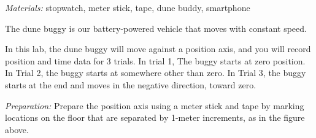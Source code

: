 \documentclass[answers]{exam}
\begin{document}
\noindent \textit{Materials:} stopwatch, meter stick, tape, dune buddy, smartphone 

\medskip

\noindent The dune buggy is our battery-powered vehicle that moves with constant speed. 

\begin{center}
\end{center}

\medskip

\noindent In this lab, the dune buggy will move against a position axis, and you will record position and time data for 3 trials. In trial 1, The buggy starts at zero position. In Trial 2, the buggy starts at somewhere other than zero. In Trial 3, the buggy starts at the end and moves in the negative direction, toward zero.

\medskip

\noindent \textit{Preparation:} Prepare the position axis using a meter stick and tape by marking locations on the floor that are separated by 1-meter increments, as in the figure above.
\end{document}
